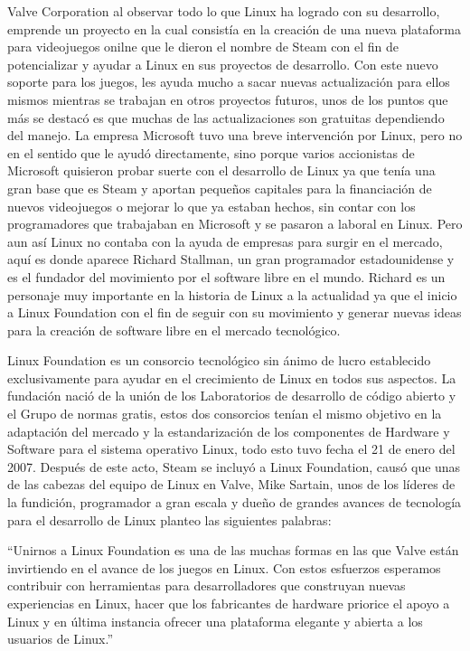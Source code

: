 Valve Corporation al observar todo lo que Linux ha logrado con
su desarrollo, emprende un proyecto en la cual consistía en la
creación de una nueva plataforma para videojuegos onilne que
le dieron el nombre de Steam con el fin de potencializar y
ayudar a Linux en sus proyectos de desarrollo. Con este nuevo
soporte para los juegos, les ayuda mucho a sacar nuevas
actualización para ellos mismos mientras se trabajan en otros
proyectos futuros, unos de los puntos que más se destacó es que
muchas de las actualizaciones son gratuitas dependiendo del
manejo. La empresa Microsoft tuvo una breve intervención por
Linux, pero no en el sentido que le ayudó directamente, sino
porque varios accionistas de Microsoft quisieron probar suerte
con el desarrollo de Linux ya que tenía una gran base que es
Steam y aportan pequeños capitales para la financiación de
nuevos videojuegos o mejorar lo que ya estaban hechos, sin
contar con los programadores que trabajaban en Microsoft y se
pasaron a laboral en Linux. Pero aun así Linux no contaba con la
ayuda de empresas para surgir en el mercado, aquí es donde
aparece Richard Stallman, un gran programador estadounidense
y es el fundador del movimiento por el software libre en el
mundo. Richard es un personaje muy importante en la historia
de Linux a la actualidad ya que el inicio a Linux Foundation con
el fin de seguir con su movimiento y generar nuevas ideas para
la creación de software libre en el mercado tecnológico.

Linux Foundation es un consorcio tecnológico sin ánimo de lucro
establecido exclusivamente para ayudar en el crecimiento de
Linux en todos sus aspectos. La fundación nació de la unión de
los Laboratorios de desarrollo de código abierto y el Grupo de
normas gratis, estos dos consorcios tenían el mismo objetivo en
la adaptación del mercado y la estandarización de los
componentes de Hardware y Software para el sistema operativo
Linux, todo esto tuvo fecha el 21 de enero del 2007. Después de
este acto, Steam se incluyó a Linux Foundation, causó que unas
de las cabezas del equipo de Linux en Valve, Mike Sartain, unos
de los líderes de la fundición, programador a gran escala y
dueño de grandes avances de tecnología para el desarrollo de
Linux planteo las siguientes palabras:

“Unirnos a Linux Foundation es una de las muchas
formas en las que Valve están invirtiendo en el
avance de los juegos en Linux. Con estos esfuerzos
esperamos contribuir con herramientas para
desarrolladores que construyan nuevas
experiencias en Linux, hacer que los fabricantes
de hardware priorice el apoyo a Linux y en última
instancia ofrecer una plataforma elegante y
abierta a los usuarios de Linux.”

